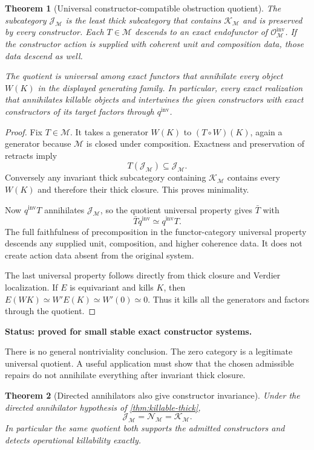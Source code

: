 \documentclass[11pt]{article}
\newtheorem{theorem}{Theorem}[section]
\theoremstyle{definition}
\theoremstyle{remark}
\newcommand{\status}[1]{\textbf{Status: #1.}}
\begin{document}
\begin{theorem}[Universal constructor-compatible obstruction quotient]\label{thm:invariant-quotient}
The subcategory $\mathcal J_{\mathscr M}$ is the least thick subcategory that contains $\mathcal K_{\mathscr M}$ and is preserved by every constructor. Each $T\in\mathscr M$ descends to an exact endofunctor of $\mathcal O^{\mathrm{inv}}_{\mathscr M}$. If the constructor action is supplied with coherent unit and composition data, those data descend as well.

The quotient is universal among exact functors that annihilate every object $W(K)$ in the displayed generating family. In particular, every exact realization that annihilates killable objects and intertwines the given constructors with exact constructors of its target factors through $q^{\mathrm{inv}}$.
\end{theorem}

\begin{proof}
Fix $T\in\mathscr M$. It takes a generator $W(K)$ to $(T\circ W)(K)$, again a generator because $\mathscr M$ is closed under composition. Exactness and preservation of retracts imply
\[
T(\mathcal J_{\mathscr M})\subseteq\mathcal J_{\mathscr M}.
\]
Conversely any invariant thick subcategory containing $\mathcal K_{\mathscr M}$ contains every $W(K)$ and therefore their thick closure. This proves minimality.

Now $q^{\mathrm{inv}}T$ annihilates $\mathcal J_{\mathscr M}$, so the quotient universal property gives $\bar T$ with
\[
\bar T q^{\mathrm{inv}}\simeq q^{\mathrm{inv}}T.
\]
The full faithfulness of precomposition in the functor-category universal property descends any supplied unit, composition, and higher coherence data. It does not create action data absent from the original system.

The last universal property follows directly from thick closure and Verdier localization. If $E$ is equivariant and kills $K$, then
$E(WK)\simeq W'E(K)\simeq W'(0)\simeq0$. Thus it kills all the generators and factors through the quotient.
\end{proof}

\status{proved for small stable exact constructor systems}

There is no general nontriviality conclusion. The zero category is a legitimate universal quotient. A useful application must show that the chosen admissible repairs do not annihilate everything after invariant thick closure.

\begin{theorem}[Directed annihilators also give constructor invariance]\label{thm:directed-invariant}
Under the directed annihilator hypothesis of \cref{thm:killable-thick},
\[
\mathcal J_{\mathscr M}=\mathcal N_{\mathscr M}
=\mathcal K_{\mathscr M}.
\]
In particular the same quotient both supports the admitted constructors and detects operational killability exactly.
\end{theorem}
\end{document}
